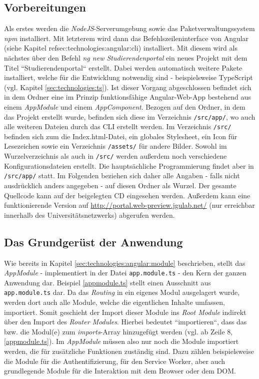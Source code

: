 \subsection{Vorbereitungen}
\label{sec:prog:preliminiaries}
Als erstes werden die \textit{NodeJS}-Serverumgebung sowie das Paketverwaltungssystem \textit{npm} installiert. Mit letzterem wird dann das Befehlszeileninterface von Angular (siehe Kapitel ref{sec:technologies:angular:cli}) installiert. Mit diesem wird als nächstes über den Befehl \textit{ng new Studierendenportal} ein neues Projekt mit dem Titel ``Studierendenportal`` erstellt. Dabei werden automatisch weitere Pakete installiert, welche für die Entwicklung notwendig sind - beispielsweise TypeScript (vgl. Kapitel \ref{sec:technologies:ts}). Ist dieser Vorgang abgeschlossen befindet sich in dem Ordner eine im Prinzip funktionsfähige Angular-Web-App bestehend aus einem \textit{AppModule} und einem \textit{AppComponent}. Bezogen auf den Ordner, in dem das Projekt erstellt wurde, befinden sich diese im Verzeichnis \texttt{/src/app/}, wo auch alle weiteren Dateien durch das \acs{CLI} erstellt werden. Im Verzeichnis \texttt{/src/} befinden sich zum die Index.html-Datei, ein globales Stylesheet,  ein Icon für Lesezeichen sowie ein Verzeichnis \texttt{/assets/} für andere Bilder. Sowohl im Wurzelverzeichnis als auch in \texttt{/src/} werden außerdem noch verschiedene Konfigurationsdateien erstellt. Die hauptsächliche Programmierung findet aber in \texttt{/src/app/} statt. Im Folgenden beziehen sich daher alle Angaben -  falls nicht ausdrücklich anders angegeben - auf diesen Ordner als Wurzel. Der gesamte Quellcode kann auf der beigelegten CD eingesehen werden. Außerdem kann eine funktionierende Version auf \href{http://portal.web-preview.jgulab.net/}{http://portal.web-preview.jgulab.net/} (nur erreichbar innerhalb des Universitätsnetzwerks) abgerufen werden.

\subsection{Das Grundgerüst der Anwendung}
\label{sec:prog:appmodule}
Wie bereits in Kapitel \ref{sec:technologies:angular:module} beschrieben, stellt das \textit{AppModule} - implementiert in der Datei \texttt{app.module.ts} - den Kern der ganzen Anwendung dar.  Beispiel \ref{appmodule.ts} stellt einen Ausschnitt aus \texttt{app.module.ts} dar. Da das \textit{Routing} in ein eigenes Modul ausgelagert wurde, werden dort auch alle Module, welche die eigentlichen Inhalte umfassen, importiert. Somit geschieht der Import dieser Module ins \textit{Root Module} indirekt über den Import des \textit{Router Modules}. Hierbei bedeutet ``importieren``, dass das bzw. die Modul(e) zum \textit{imports}-Array hinzugefügt werden (vgl. ab Zeile 8, \ref{appmodule.ts}). Im \textit{AppModule} müssen also nur noch die Module importiert werden, die für zusätzliche Funktionen zuständig sind. Dazu zählen beispielsweise die Module für die Authentifizierung, für den Service Worker, aber auch grundlegende Module für die Interaktion mit dem Browser oder dem \acs{DOM}.

